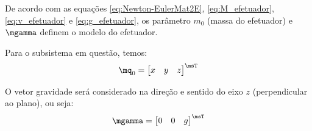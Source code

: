 \documentclass[]{politex}
\begin{document}
De acordo com as equações \eqref{eq:Newton-EulerMat2E}, \eqref{eq:M_efetuador}, \eqref{eq:v_efetuador} e \eqref{eq:g_efetuador}, os parâmetro $m_0$ (massa do efetuador) e $\mgamma$ definem o modelo do efetuador.




Para o subsistema em questão, temos:
\begin{equation}
\mq_0 = \begin{bmatrix}
x & y & z
\end{bmatrix}^\msT
\end{equation}

O vetor gravidade será considerado na direção e sentido do eixo $z$ (perpendicular ao plano), ou seja:
\begin{equation}
\mgamma = \begin{bmatrix}
0 & 0 & g
\end{bmatrix}^\msT
\end{equation}

\end{document}
